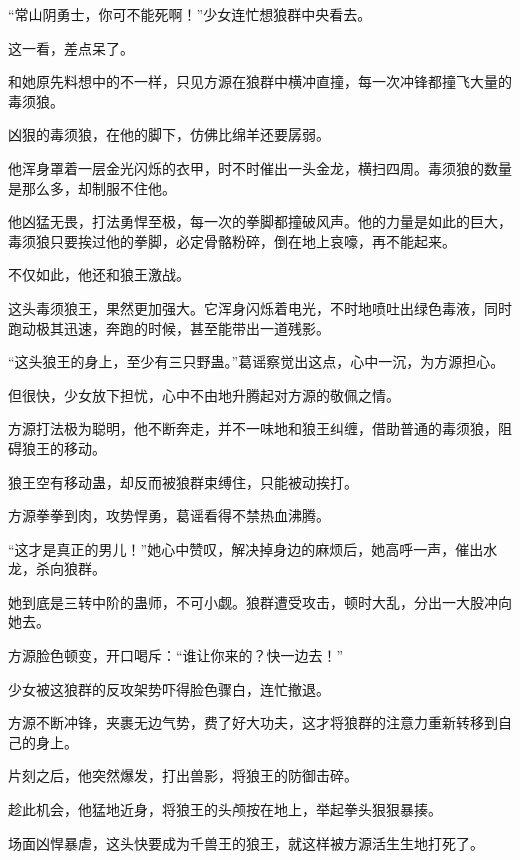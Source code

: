 \begin{this_body}
“常山阴勇士，你可不能死啊！”少女连忙想狼群中央看去。

这一看，差点呆了。

和她原先料想中的不一样，只见方源在狼群中横冲直撞，每一次冲锋都撞飞大量的毒须狼。

凶狠的毒须狼，在他的脚下，仿佛比绵羊还要孱弱。

他浑身罩着一层金光闪烁的衣甲，时不时催出一头金龙，横扫四周。毒须狼的数量是那么多，却制服不住他。

他凶猛无畏，打法勇悍至极，每一次的拳脚都撞破风声。他的力量是如此的巨大，毒须狼只要挨过他的拳脚，必定骨骼粉碎，倒在地上哀嚎，再不能起来。

不仅如此，他还和狼王激战。

这头毒须狼王，果然更加强大。它浑身闪烁着电光，不时地喷吐出绿色毒液，同时跑动极其迅速，奔跑的时候，甚至能带出一道残影。

“这头狼王的身上，至少有三只野蛊。”葛谣察觉出这点，心中一沉，为方源担心。

但很快，少女放下担忧，心中不由地升腾起对方源的敬佩之情。

方源打法极为聪明，他不断奔走，并不一味地和狼王纠缠，借助普通的毒须狼，阻碍狼王的移动。

狼王空有移动蛊，却反而被狼群束缚住，只能被动挨打。

方源拳拳到肉，攻势悍勇，葛谣看得不禁热血沸腾。

“这才是真正的男儿！”她心中赞叹，解决掉身边的麻烦后，她高呼一声，催出水龙，杀向狼群。

她到底是三转中阶的蛊师，不可小觑。狼群遭受攻击，顿时大乱，分出一大股冲向她去。

方源脸色顿变，开口喝斥：“谁让你来的？快一边去！”

少女被这狼群的反攻架势吓得脸色骤白，连忙撤退。

方源不断冲锋，夹裹无边气势，费了好大功夫，这才将狼群的注意力重新转移到自己的身上。

片刻之后，他突然爆发，打出兽影，将狼王的防御击碎。

趁此机会，他猛地近身，将狼王的头颅按在地上，举起拳头狠狠暴揍。

场面凶悍暴虐，这头快要成为千兽王的狼王，就这样被方源活生生地打死了。

\end{this_body}

